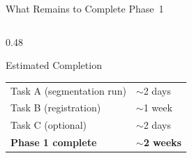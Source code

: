 \documentclass[aspectratio=169, dvipsnames]{beamer}
\begin{document}
\begin{frame}{What Remains to Complete Phase~1}
\begin{columns}
\begin{column}{0.48\textwidth}
            \vspace{0.3em}

            \begin{exampleblock}{ Estimated Completion}
                \small
                \begin{tabular}{ll}
                    \toprule
                    Task A (segmentation run) & $\sim$2 days \\
                    Task B (registration) & $\sim$1 week \\
                    Task C (optional) & $\sim$2 days \\
                    \midrule
                    \textbf{Phase 1 complete} & \textbf{$\sim$2 weeks} \\
                    \bottomrule
                \end{tabular}
            \end{exampleblock}
        \end{column}
    \end{columns}
\end{frame}
\end{document}
